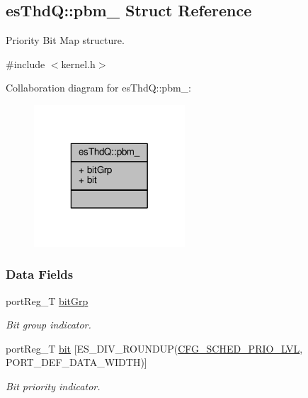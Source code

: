 \hypertarget{structesThdQ_1_1pbm__}{\subsection{es\-Thd\-Q\-:\-:pbm\-\_\- Struct Reference}
\label{structesThdQ_1_1pbm__}
}


Priority Bit Map structure.  




{\ttfamily \#include $<$kernel.\-h$>$}



Collaboration diagram for es\-Thd\-Q\-:\-:pbm\-\_\-\-:\nopagebreak
\begin{figure}[H]
\begin{center}
\leavevmode
\includegraphics[width=160pt]{structesThdQ_1_1pbm____coll__graph}
\end{center}
\end{figure}
\subsubsection*{Data Fields}
\begin{DoxyCompactItemize}
\item 
port\-Reg\-\_\-\-T \hyperlink{structesThdQ_1_1pbm___aa24f418263c2f73a4a38d7f01fa3460a}{bit\-Grp}
\begin{DoxyCompactList}\small\item\em Bit group indicator. \end{DoxyCompactList}\item 
port\-Reg\-\_\-\-T \hyperlink{structesThdQ_1_1pbm___a3ba3044daa9e71d5e38acd0277dc9c58}{bit} \mbox{[}E\-S\-\_\-\-D\-I\-V\-\_\-\-R\-O\-U\-N\-D\-U\-P(\hyperlink{group__template__kern__cfg_ga56bd89fe76f7fe22f3d8805bc3c68892}{C\-F\-G\-\_\-\-S\-C\-H\-E\-D\-\_\-\-P\-R\-I\-O\-\_\-\-L\-V\-L}, P\-O\-R\-T\-\_\-\-D\-E\-F\-\_\-\-D\-A\-T\-A\-\_\-\-W\-I\-D\-T\-H)\mbox{]}
\begin{DoxyCompactList}\small\item\em Bit priority indicator. \end{DoxyCompactList}\end{DoxyCompactItemize}


